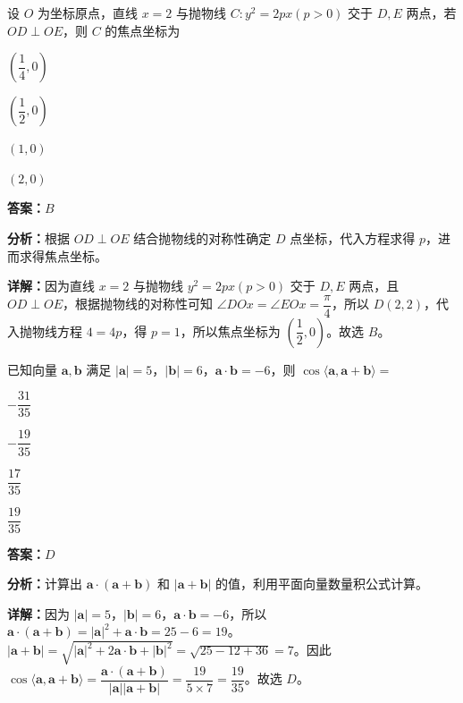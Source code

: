 \begin{question}[points=5]
设 $O$ 为坐标原点，直线 $x=2$ 与抛物线 $C:y^2=2px(p>0)$ 交于 $D,E$ 两点，若 $OD\perp OE$，则 $C$ 的焦点坐标为
\begin{choices}
  \item $(\dfrac14,0)$
  \item $(\dfrac12,0)$
  \item $(1,0)$
  \item $(2,0)$
\end{choices}
\begin{solution}
\textbf{答案：}$B$

\textbf{分析：}根据 $OD\perp OE$ 结合抛物线的对称性确定 $D$ 点坐标，代入方程求得 $p$，进而求得焦点坐标。

\textbf{详解：}因为直线 $x=2$ 与抛物线 $y^2=2px(p>0)$ 交于 $D,E$ 两点，且 $OD\perp OE$，根据抛物线的对称性可知 $\angle DOx=\angle EO x=\dfrac{\pi}{4}$，所以 $D(2,2)$，代入抛物线方程 $4=4p$，得 $p=1$，所以焦点坐标为 $(\dfrac12,0)$。故选 $B$。
\end{solution}
\end{question}

\begin{question}[points=5]
已知向量 $\mathbf{a},\mathbf{b}$ 满足 $|\mathbf{a}|=5$，$|\mathbf{b}|=6$，$\mathbf{a}\cdot\mathbf{b}=-6$，则 $\cos\langle\mathbf{a},\mathbf{a}+\mathbf{b}\rangle=$
\begin{choices}
  \item $-\dfrac{31}{35}$
  \item $-\dfrac{19}{35}$
  \item $\dfrac{17}{35}$
  \item $\dfrac{19}{35}$
\end{choices}
\begin{solution}
\textbf{答案：}$D$

\textbf{分析：}计算出 $\mathbf{a}\cdot(\mathbf{a}+\mathbf{b})$ 和 $|\mathbf{a}+\mathbf{b}|$ 的值，利用平面向量数量积公式计算。

\textbf{详解：}因为 $|\mathbf{a}|=5$，$|\mathbf{b}|=6$，$\mathbf{a}\cdot\mathbf{b}=-6$，所以 $\mathbf{a}\cdot(\mathbf{a}+\mathbf{b})=|\mathbf{a}|^2+\mathbf{a}\cdot\mathbf{b}=25-6=19$。$|\mathbf{a}+\mathbf{b}|=\sqrt{|\mathbf{a}|^2+2\mathbf{a}\cdot\mathbf{b}+|\mathbf{b}|^2}=\sqrt{25-12+36}=7$。因此 $\cos\langle\mathbf{a},\mathbf{a}+\mathbf{b}\rangle=\dfrac{\mathbf{a}\cdot(\mathbf{a}+\mathbf{b})}{|\mathbf{a}||\mathbf{a}+\mathbf{b}|}=\dfrac{19}{5\times7}=\dfrac{19}{35}$。故选 $D$。
\end{solution}
\end{question}

